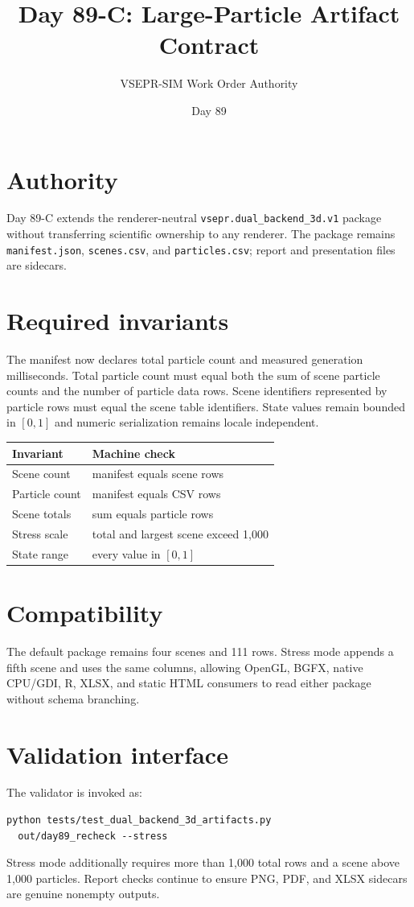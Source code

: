 \documentclass[11pt]{article}
\title{Day 89-C: Large-Particle Artifact Contract}
\author{VSEPR-SIM Work Order Authority}
\date{Day 89}
\begin{document}
\maketitle
\section{Authority}
Day 89-C extends the renderer-neutral \texttt{vsepr.dual\_backend\_3d.v1} package without transferring scientific ownership to any renderer. The package remains \texttt{manifest.json}, \texttt{scenes.csv}, and \texttt{particles.csv}; report and presentation files are sidecars.

\section{Required invariants}
The manifest now declares total particle count and measured generation milliseconds. Total particle count must equal both the sum of scene particle counts and the number of particle data rows. Scene identifiers represented by particle rows must equal the scene table identifiers. State values remain bounded in $[0,1]$ and numeric serialization remains locale independent.

\begin{center}
\begin{tabular}{ll}
\toprule
Invariant & Machine check \\
\midrule
Scene count & manifest equals scene rows \\
Particle count & manifest equals CSV rows \\
Scene totals & sum equals particle rows \\
Stress scale & total and largest scene exceed 1,000 \\
State range & every value in $[0,1]$ \\
\bottomrule
\end{tabular}
\end{center}

\section{Compatibility}
The default package remains four scenes and 111 rows. Stress mode appends a fifth scene and uses the same columns, allowing OpenGL, BGFX, native CPU/GDI, R, XLSX, and static HTML consumers to read either package without schema branching.

\newpage
\section{Validation interface}
The validator is invoked as:
\begin{verbatim}
python tests/test_dual_backend_3d_artifacts.py
  out/day89_recheck --stress
\end{verbatim}
Stress mode additionally requires more than 1,000 total rows and a scene above 1,000 particles. Report checks continue to ensure PNG, PDF, and XLSX sidecars are genuine nonempty outputs.
\end{document}
